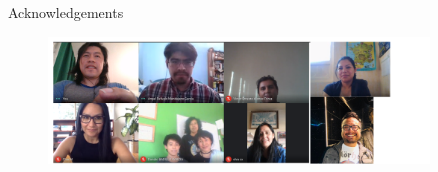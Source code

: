 {
\begin{frame}{Acknowledgements}


      \begin{figure}
        \centering
        \includegraphics[width=0.9\textwidth]{./figures/team/versions/drawing-v00.png}
      \end{figure}


\end{frame}
}

